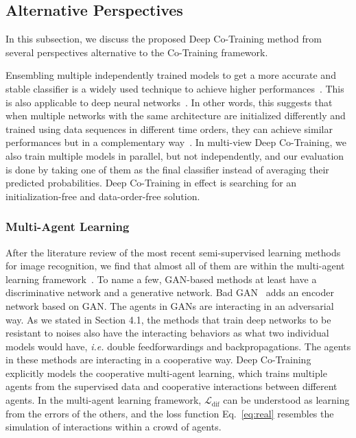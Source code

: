 \documentclass[runningheads]{llncs}
\begin{document}
\subsection{Alternative Perspectives}
In this subsection, we discuss the proposed Deep Co-Training method from several perspectives alternative to the Co-Training framework.

Ensembling multiple independently trained models to get a more accurate and stable classifier is a widely used technique to achieve higher performances~\cite{bagging}.
This is also applicable to deep neural networks~\cite{ensemble1,ensemble2}.
In other words, this suggests that when multiple networks with the same architecture are initialized differently and trained using data sequences in different time orders, they can achieve similar performances but in a complementary way~\cite{twoculture}.
In multi-view Deep Co-Training, we also train multiple models in parallel, but not independently, and our evaluation is done by taking one of them as the final classifier instead of averaging their predicted probabilities.
Deep Co-Training in effect is searching for an initialization-free and data-order-free solution.

\subsubsection{Multi-Agent Learning}
After the literature review of the most recent semi-supervised learning methods for image recognition, we find that almost all of them are within the multi-agent learning framework~\cite{malearn}.
To name a few, GAN-based methods at least have a discriminative network and a generative network.
Bad GAN~\cite{badgan} adds an encoder network based on GAN.
The agents in GANs are interacting in an adversarial way.
As we stated in Section 4.1, the methods that train deep networks to be resistant to noises also have the interacting behaviors as what two individual models would have, \textit{i.e.} double feedforwardings and backpropagations.
The agents in these methods are interacting in a cooperative way.
Deep Co-Training explicitly models the cooperative multi-agent learning, which trains multiple agents from the supervised data and cooperative interactions between different agents.
In the multi-agent learning framework, $\mathcal{L}_{\text{dif}}$ can be understood as learning from the errors of the others, and the loss function Eq.~\ref{eq:real} resembles the simulation of interactions within a crowd of agents.
\end{document}
